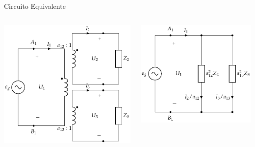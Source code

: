 \documentclass[aspectratio=169, usenames,svgnames,dvipsnames]{beamer}
\begin{document}
\begin{frame}[label={sec:orgc977c2f}]{Circuito Equivalente}
\begin{columns}
\begin{column}{0.5\columnwidth}
\begin{center}
\includegraphics[width=.9\linewidth]{../figs/TrafoIdealVariosDevanados_Impedancia.pdf}
\end{center}
\end{column}

\begin{column}{0.5\columnwidth}
\begin{center}
\includegraphics[width=.9\linewidth]{../figs/TrafoIdealVariosDevanados_Impedancia_Equivalente.pdf}
\end{center}
\end{column}
\end{columns}
\end{frame}
\end{document}
